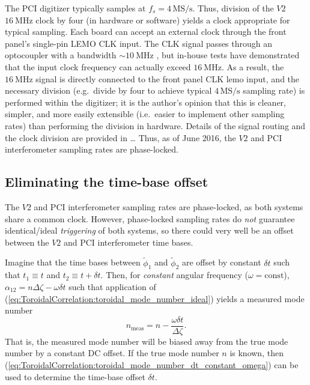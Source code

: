 The PCI digitizer typically samples at $f_s = 4 \, \text{MS/s}$.
Thus, division of the $V2$ $\SI{16}{\mega\hertz}$ clock by four
(in hardware or software) yields a clock appropriate for typical sampling.
Each board can accept an external clock
through the front panel's single-pin LEMO CLK input.
The CLK signal passes through an optocoupler
with a bandwidth $\sim \SI{10}{\mega\hertz}$
\cite{milne_optocoupler_pc16}, but
in-house tests have demonstrated
that the input clock frequency
can actually exceed $\SI{16}{\mega\hertz}$.
As a result, the $\SI{16}{\mega\hertz}$ signal
is directly connected to the front panel CLK lemo input, and
the necessary division
(e.g.\ divide by four to achieve typical $4 \, \text{MS/s}$ sampling rate)
is performed within the digitizer;
it is the author's opinion that
this is cleaner, simpler, and more easily extensible
(i.e.\ easier to implement other sampling rates)
than performing the division in hardware.
Details of the signal routing and the clock division
are provided in \ldots %
Thus, as of June 2016,
the $V2$ and PCI interferometer sampling rates
are phase-locked.


\subsection{Eliminating the time-base offset}
The $V2$ and PCI interferometer sampling rates are phase-locked,
as both systems share a common clock.
However, phase-locked sampling rates do \emph{not} guarantee
identical/ideal \emph{triggering} of both systems, so
there could very well be an offset between the
$V2$ and PCI interferometer time bases.

Imagine that the time bases between $\tilde{\phi}_1$ and $\tilde{\phi}_2$
are offset by constant $\delta t$ such that
$t_1 \equiv t$ and $t_2 \equiv t + \delta t$.
Then, for \emph{constant} angular frequency ($\omega = \text{const}$),
$\alpha_{12} = n \Delta \zeta - \omega \delta t$
such that application of
(\ref{eq:ToroidalCorrelation:toroidal_mode_number_ideal})
yields a measured mode number
\begin{equation}
  n_{\text{meas}} = n - \frac{\omega \delta t}{\Delta \zeta}.
  \label{eq:ToroidalCorrelation:toroidal_mode_number_dt_constant_omega}
\end{equation}
That is, the measured mode number will be biased away from
the true mode number by a constant DC offset.
If the true mode number $n$ is known,
then (\ref{eq:ToroidalCorrelation:toroidal_mode_number_dt_constant_omega})
can be used to determine the time-base offset $\delta t$.

